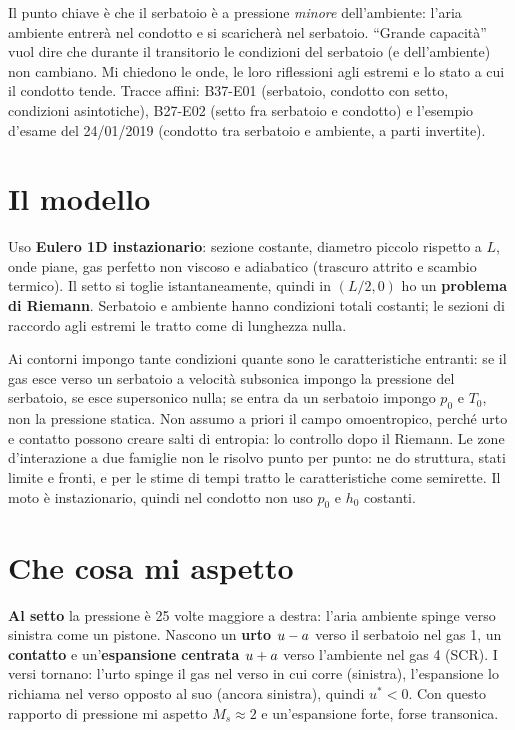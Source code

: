 Il punto chiave è che il serbatoio è a pressione \emph{minore} dell'ambiente: l'aria ambiente entrerà nel condotto e si
scaricherà nel serbatoio. ``Grande capacità'' vuol dire che durante il transitorio le condizioni del serbatoio (e
dell'ambiente) non cambiano. Mi chiedono le onde, le loro riflessioni agli estremi e lo stato a cui il condotto
tende. Tracce affini: B37-E01 (serbatoio, condotto con setto, condizioni asintotiche), B27-E02 (setto fra serbatoio e
condotto) e l'esempio d'esame del 24/01/2019 (condotto tra serbatoio e ambiente, a parti invertite).

\section*{Il modello}
Uso \textbf{Eulero 1D instazionario}: sezione costante, diametro piccolo rispetto a $L$, onde piane, gas perfetto non
viscoso e adiabatico (trascuro attrito e scambio termico). Il setto si toglie istantaneamente, quindi in $(L/2,0)$ ho
un \textbf{problema di Riemann}. Serbatoio e ambiente hanno condizioni totali costanti; le sezioni di raccordo agli
estremi le tratto come di lunghezza nulla.

Ai contorni impongo tante condizioni quante sono le caratteristiche entranti: se il gas esce verso un serbatoio a
velocità subsonica impongo la pressione del serbatoio, se esce supersonico nulla; se entra da un serbatoio impongo
$p_0$ e $T_0$, non la pressione statica. Non assumo a priori il campo omoentropico, perché urto e contatto possono
creare salti di entropia: lo controllo dopo il Riemann. Le zone d'interazione a due famiglie non le risolvo punto per
punto: ne do struttura, stati limite e fronti, e per le stime di tempi tratto le caratteristiche come semirette. Il
moto è instazionario, quindi nel condotto non uso $p_0$ e $h_0$ costanti.

\section*{Che cosa mi aspetto}
\textbf{Al setto} la pressione è 25 volte maggiore a destra: l'aria ambiente spinge verso sinistra come un pistone.
Nascono un \textbf{urto $u-a$} verso il serbatoio nel gas 1, un \textbf{contatto} e un'\textbf{espansione centrata
$u+a$} verso l'ambiente nel gas 4 (SCR). I versi tornano: l'urto spinge il gas nel verso in cui corre (sinistra),
l'espansione lo richiama nel verso opposto al suo (ancora sinistra), quindi $u^*<0$. Con questo rapporto di pressione mi
aspetto $M_s\approx2$ e un'espansione forte, forse transonica.

